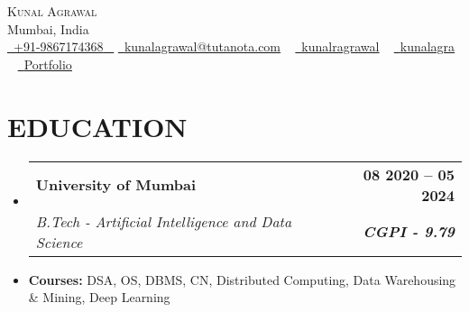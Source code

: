 \documentclass[letterpaper,11pt]{article}
\makeatletter
\newcommand{\resumeItem}[1]{
  \item\small{
    {#1 \vspace{-2pt}}
  }
}
\newcommand{\resumeSubheading}[4]{
  \vspace{-2pt}\item
    \begin{tabular*}{1.0\textwidth}[t]{l@{\extracolsep{\fill}}r}
      \textbf{\large#1} & \textbf{\small #2} \\
      \textit{\large#3} & \textit{\small #4} \\
      
    \end{tabular*}\vspace{-7pt}
}
\newcommand{\resumeSubHeadingListStart}{\begin{itemize}[leftmargin=0.0in, label={}]}
\newcommand{\resumeSubHeadingListEnd}{\end{itemize}}
\makeatother
\begin{document}


\begin{center}
    {\Huge \scshape {Kunal Agrawal}} \\ \vspace{1pt}
    Mumbai, India \\ \vspace{1pt}
    \small \href{tel:+919867174368}{ \raisebox{-0.1\height}{\faPhone*}\ \underline{+91-9867174368} ~} \href{mailto:kunalagrawal@tutanota.com}{\raisebox{-0.2\height}{\faEnvelope[regular]}\  \underline{kunalagrawal@tutanota.com}} ~ 
    \href{https://linkedin.com/in/kunalragrawal}{\raisebox{-0.2\height}\faLinkedinIn\ \underline{kunalragrawal}}  ~
    \href{https://github.com/kunalagra}{\raisebox{-0.2\height}\faGithub\ \underline{kunalagra}} ~
    \href{https://kunalagrawal.vercel.app/}{\raisebox{-0.2\height}{\faLink}\ \underline{Portfolio}}
    \vspace{-8pt}
\end{center}


\section{EDUCATION}
  \resumeSubHeadingListStart
    \resumeSubheading
      {University of Mumbai}{08 2020 -- 05 2024}
      {B.Tech - Artificial Intelligence and Data Science}{\textbf{CGPI - 9.79}}
        \resumeItem{\normalsize{\textbf{Courses:} DSA, OS, DBMS, CN, Distributed Computing, Data Warehousing \& Mining, Deep Learning}}
  
      
  \resumeSubHeadingListEnd
  

\end{document}
